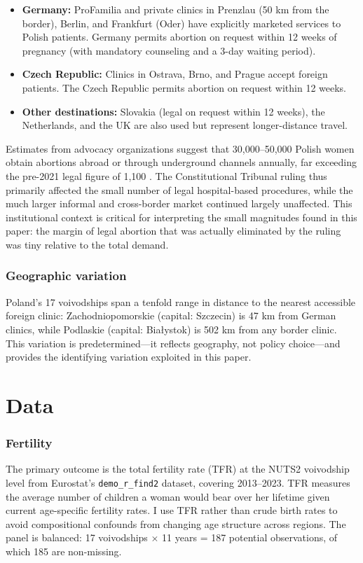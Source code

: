 \documentclass[12pt]{article}
\begin{document}
\begin{itemize}
\item \textbf{Germany:} ProFamilia and private clinics in Prenzlau (50 km from the border), Berlin, and Frankfurt (Oder) have explicitly marketed services to Polish patients. Germany permits abortion on request within 12 weeks of pregnancy (with mandatory counseling and a 3-day waiting period).
\item \textbf{Czech Republic:} Clinics in Ostrava, Brno, and Prague accept foreign patients. The Czech Republic permits abortion on request within 12 weeks.
\item \textbf{Other destinations:} Slovakia (legal on request within 12 weeks), the Netherlands, and the UK are also used but represent longer-distance travel.
\end{itemize}

Estimates from advocacy organizations suggest that 30,000--50,000 Polish women obtain abortions abroad or through underground channels annually, far exceeding the pre-2021 legal figure of 1,100 \citep{bearak2020}. The Constitutional Tribunal ruling thus primarily affected the small number of legal hospital-based procedures, while the much larger informal and cross-border market continued largely unaffected. This institutional context is critical for interpreting the small magnitudes found in this paper: the margin of legal abortion that was actually eliminated by the ruling was tiny relative to the total demand.

\subsubsection*{Geographic variation} Poland's 17 voivodships span a tenfold range in distance to the nearest accessible foreign clinic: Zachodniopomorskie (capital: Szczecin) is 47 km from German clinics, while Podlaskie (capital: Bia\l ystok) is 502 km from any border clinic. This variation is predetermined---it reflects geography, not policy choice---and provides the identifying variation exploited in this paper.


\section{Data}
\label{sec:data}

\subsubsection*{Fertility} The primary outcome is the total fertility rate (TFR) at the NUTS2 voivodship level from Eurostat's \texttt{demo\_r\_find2} dataset, covering 2013--2023. TFR measures the average number of children a woman would bear over her lifetime given current age-specific fertility rates. I use TFR rather than crude birth rates to avoid compositional confounds from changing age structure across regions. The panel is balanced: 17 voivodships $\times$ 11 years = 187 potential observations, of which 185 are non-missing.
\end{document}
